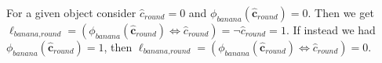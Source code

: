 \begin{example}
    For a given object consider $\hat{c}_{\textit{round}}=0$ and $\phi_{\textit{banana}}(\hat{\mathbf{c}}_{\textit{round}})=0$. Then we get $\ell_{\textit{banana},\textit{round}}=(\phi_{\textit{banana}}(\hat{\mathbf{c}}_{\textit{round}}) \Leftrightarrow \hat{c}_{\textit{round}})=\neg \hat{c}_{\textit{round}}=1$. If instead we had $\phi_{\textit{banana}}(\hat{\mathbf{c}}_{\textit{round}}) = 1$, then $\ell_{\textit{banana},\textit{round}}=(\phi_{\textit{banana}}(\hat{\mathbf{c}}_{\textit{round}}) \Leftrightarrow \hat{c}_{\textit{round}})=0$.
\end{example}



